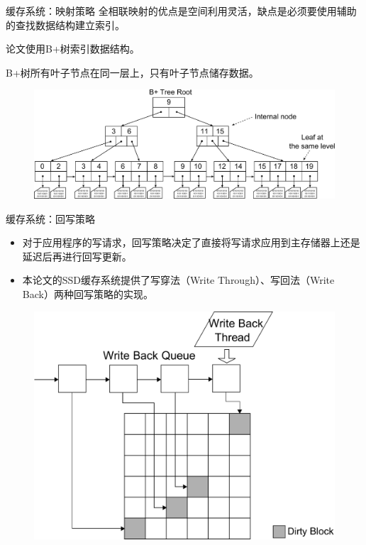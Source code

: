 \documentclass[compress]{beamer}
\begin{document}
\begin{frame}{缓存系统：映射策略}
全相联映射的优点是空间利用灵活，缺点是必须要使用辅助的查找数据结构建立索引。

论文使用B+树索引数据结构。

B+树所有叶子节点在同一层上，只有叶子节点储存数据。
\begin{figure}
\includegraphics[width=0.9\linewidth]{../graph/bplus-tree}
\end{figure}
\end{frame}

\begin{frame}{缓存系统：回写策略}
\begin{itemize}
\item 对于应用程序的写请求，回写策略决定了直接将写请求应用到主存储器上还是延迟后再进行回写更新。
\item 本论文的SSD缓存系统提供了写穿法（Write Through）、写回法（Write Back）两种回写策略的实现。
\end{itemize}
\begin{figure}
\includegraphics[width=0.6\linewidth]{../graph/write-back-queue}
\end{figure}
\end{frame}
\end{document}
